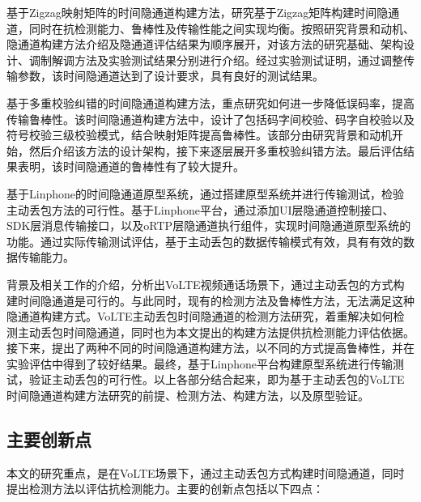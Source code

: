 基于Zigzag映射矩阵的时间隐通道构建方法，研究基于Zigzag矩阵构建时间隐通道，同时在抗检测能力、鲁棒性及传输性能之间实现均衡。按照研究背景和动机、隐通道构建方法介绍及隐通道评估结果为顺序展开，对该方法的研究基础、架构设计、调制解调方法及实验测试结果分别进行介绍。经过实验测试证明，通过调整传输参数，该时间隐通道达到了设计要求，具有良好的测试结果。

基于多重校验纠错的时间隐通道构建方法，重点研究如何进一步降低误码率，提高传输鲁棒性。该时间隐通道构建方法中，设计了包括码字间校验、码字自校验以及符号校验三级校验模式，结合映射矩阵提高鲁棒性。该部分由研究背景和动机开始，然后介绍该方法的设计架构，接下来逐层展开多重校验纠错方法。最后评估结果表明，该时间隐通道的鲁棒性有了较大提升。

基于Linphone的时间隐通道原型系统，通过搭建原型系统并进行传输测试，检验主动丢包方法的可行性。基于Linphone平台，通过添加UI层隐通道控制接口、SDK层消息传输接口，以及oRTP层隐通道执行组件，实现时间隐通道原型系统的功能。通过实际传输测试评估，基于主动丢包的数据传输模式有效，具有有效的数据传输能力。

背景及相关工作的介绍，分析出VoLTE视频通话场景下，通过主动丢包的方式构建时间隐通道是可行的。与此同时，现有的检测方法及鲁棒性方法，无法满足这种隐通道构建方式。VoLTE主动丢包时间隐通道的检测方法研究，着重解决如何检测主动丢包时间隐通道，同时也为本文提出的构建方法提供抗检测能力评估依据。接下来，提出了两种不同的时间隐通道构建方法，以不同的方式提高鲁棒性，并在实验评估中得到了较好结果。最终，基于Linphone平台构建原型系统进行传输测试，验证主动丢包的可行性。以上各部分结合起来，即为基于主动丢包的VoLTE时间隐通道构建方法研究的前提、检测方法、构建方法，以及原型验证。

\subsection{主要创新点}
\label{sec:intro:work:inno}

本文的研究重点，是在VoLTE场景下，通过主动丢包方式构建时间隐通道，同时提出检测方法以评估抗检测能力。主要的创新点包括以下四点：

